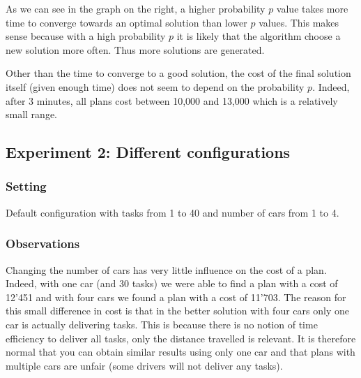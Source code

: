 \documentclass[11pt]{article}
\begin{document}
 As we can see in the graph on the right, a higher probability $p$ value takes
 more time to converge towards an optimal solution than lower $p$ values. This
 makes sense because with a high probability $p$ it is likely that the algorithm
 choose a new solution more often. Thus more solutions are generated. 
 
 Other than the time to converge to a good solution, the cost of the final
 solution itself (given enough time) does not seem to depend on the probability
 $p$. Indeed, after 3 minutes, all plans cost between 10,000 and 13,000 which is
 a relatively small range.



 \subsection{Experiment 2: Different configurations}

 \subsubsection{Setting}
 Default configuration with tasks from 1 to 40 and number of cars from 1 to 4.

 \subsubsection{Observations}
 
 Changing the number of cars has very little influence on the cost of a plan.
 Indeed, with one car (and 30 tasks) we were able to find a plan with a cost of
 12'451 and with four cars we found a plan with a cost of 11'703. The reason for
 this small difference in cost is that in the better solution with four cars
 only one car is actually delivering tasks. This is because there is no notion
 of time efficiency to deliver all tasks, only the distance travelled is
 relevant. It is therefore normal that you can obtain similar results using only
 one car and that plans with multiple cars are unfair (some drivers will not
 deliver any tasks).
\\
\end{document}
